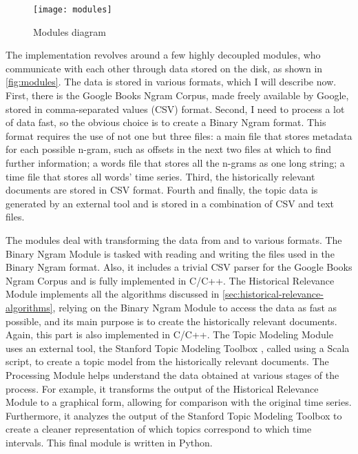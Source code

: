 
\begin{figure}
\centering
\texttt{[image: modules]}
\caption{Modules diagram}
\label{fig:modules}
\end{figure}

The implementation revolves around a few highly decoupled modules, who communicate with each other through data stored on the disk, as shown in \autoref{fig:modules}. The data is stored in various formats, which I will describe now. First, there is the Google Books Ngram Corpus, made freely available by Google, stored in comma-separated values (CSV) format. Second, I need to process a lot of data fast, so the obvious choice is to create a Binary Ngram format. This format requires the use of not one but three files: a main file that stores metadata for each possible n-gram, such as offsets in the next two files at which to find further information; a words file that stores all the n-grams as one long string; a time file that stores all words' time series. Third, the historically relevant documents are stored in CSV format. Fourth and finally, the topic data is generated by an external tool and is stored in a combination of CSV and text files.

The modules deal with transforming the data from and to various formats. The Binary Ngram Module is tasked with reading and writing the files used in the Binary Ngram format. Also, it includes a trivial CSV parser for the Google Books Ngram Corpus and is fully implemented in C/C++. The Historical Relevance Module implements all the algorithms discussed in \autoref{sec:historical-relevance-algorithms}, relying on the Binary Ngram Module to access the data as fast as possible, and its main purpose is to create the historically relevant documents. Again, this part is also implemented in C/C++. The Topic Modeling Module uses an external tool, the Stanford Topic Modeling Toolbox \cite{stanfordtmt}, called using a Scala script, to create a topic model from the historically relevant documents. The Processing Module helps understand the data obtained at various stages of the process. For example, it transforms the output of the Historical Relevance Module to a graphical form, allowing for comparison with the original time series. Furthermore, it analyzes the output of the Stanford Topic Modeling Toolbox to create a cleaner representation of which topics correspond to which time intervals. This final module is written in Python.
